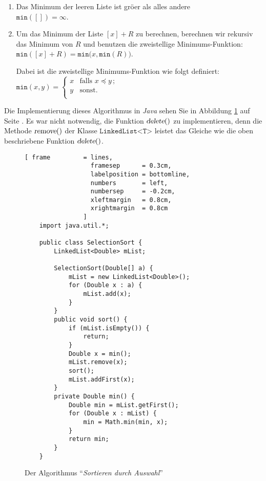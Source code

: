 \begin{enumerate}
\item Das Minimum der leeren Liste ist gr\"o\3er als alles andere \\[0.1cm]
      \hspace*{1.3cm} $\mathtt{min}([]) = \infty$.
\item Um das Minimum der Liste $[x] + R$ zu berechnen, berechnen wir rekursiv das Minimum
      von $R$ und benutzen die zweistellige Minimums-Funktion: \\[0.1cm]
      \hspace*{1.3cm} 
      $\mathtt{min}([x] + R) = \mathtt{min}\bigl(x, \mathtt{min}(R) \bigr)$. 

      Dabei ist die zweistellige Minimums-Funktion wie folgt definiert: \\[0.1cm]
      \hspace*{1.3cm} 
      $\mathtt{min}(x,y) = \left\{
      \begin{array}{ll}
        x  & \mbox{falls $x \preceq y\,$;} \\
        y  & \mbox{sonst.} \\
      \end{array}\right.
      $
\end{enumerate}
Die Implementierung dieses Algorithmus in \textsl{Java} sehen Sie in Abbildung
\ref{fig:selection-sort} auf Seite \pageref{fig:selection-sort}.  Es war nicht notwendig,
die Funktion $\textsl{delete}()$ zu implementieren, denn die Methode $\textsl{remove}()$
der Klasse $\texttt{LinkedList<T>}$ leistet das Gleiche wie die oben beschriebene Funktion
$\textsl{delete}()$.

\begin{figure}[!ht]
  \centering
\begin{Verbatim}[ frame         = lines, 
                  framesep      = 0.3cm, 
                  labelposition = bottomline,
                  numbers       = left,
                  numbersep     = -0.2cm,
                  xleftmargin   = 0.8cm,
                  xrightmargin  = 0.8cm
                ]
    import java.util.*;
    
    public class SelectionSort {
        LinkedList<Double> mList;
        
        SelectionSort(Double[] a) {
            mList = new LinkedList<Double>();
            for (Double x : a) {
                mList.add(x);
            }
        }
        public void sort() {
            if (mList.isEmpty()) {
                return;
            }
            Double x = min();
            mList.remove(x);
            sort();
            mList.addFirst(x);
        }    
        private Double min() {
            Double min = mList.getFirst();
            for (Double x : mList) {
                min = Math.min(min, x);
            }
            return min;
        }
    }
\end{Verbatim}
\vspace*{-0.3cm}
  \caption{Der Algorithmus ``\emph{Sortieren durch Auswahl}''}
  \label{fig:selection-sort}
\end{figure}

